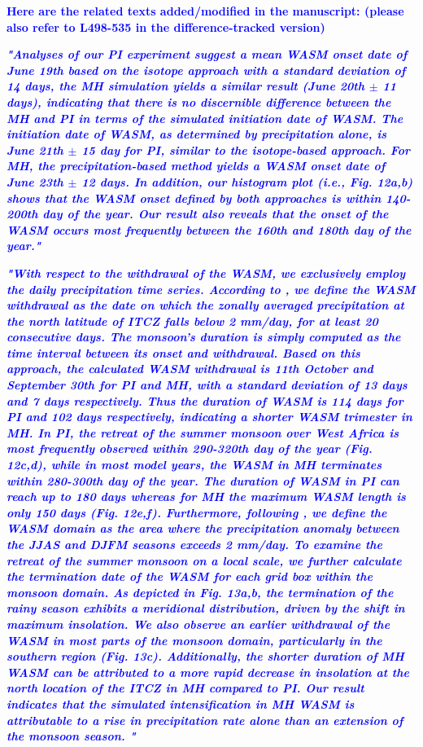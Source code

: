 \documentclass[gmd, manuscript]{copernicus}
\begin{document}
 \textcolor{blue}{\textbf{Here are the related texts added/modified in the manuscript: (please also refer to L498-535 in the difference-tracked version)}}

 \textcolor{blue}{\textbf{\textit{"Analyses of our PI experiment suggest a mean WASM onset date of June 19th  based on the isotope approach with a standard deviation of 14 days,  the MH simulation yields a similar result (June 20th $\pm$ 11 days),  indicating that there is no discernible difference between the MH and PI in terms of the simulated  initiation date  of WASM. The initiation date of WASM, as determined by precipitation alone, is June 21th $\pm$ 15 day for PI, similar to the isotope-based approach. For MH,  the precipitation-based method yields a  WASM onset date of June 23th $\pm$ 12 days.  In addition, our histogram plot (i.e., Fig. 12a,b) shows that the WASM onset defined by both approaches is  within 140-200th day of the year. Our result also reveals that the onset of the WASM occurs most frequently between the 160th and 180th day of the year."}}}

 \textcolor{blue}{\textbf{\textit{"With respect to the withdrawal of the WASM, we exclusively employ the daily precipitation time series.   According to \citet{pausata2016impacts}, we define the WASM withdrawal as the date on which the zonally averaged precipitation at the north latitude of ITCZ falls below 2 mm/day, for at least 20 consecutive days. The monsoon’s duration is simply computed as the time interval between its onset and withdrawal. Based on this approach, the calculated WASM withdrawal is  11th October and September 30th for  PI and MH, with a standard deviation of 13 days and 7 days respectively. Thus the duration of WASM is 114 days for PI and 102 days respectively, indicating a shorter WASM trimester in MH. In PI, the retreat of the summer monsoon over West Africa is most frequently observed within 290-320th day of the year (Fig. 12c,d), while in most model years, the WASM in MH terminates within 280-300th day of the year. The duration of WASM in PI can reach up to 180 days whereas for MH the maximum WASM length is only 150 days (Fig. 12e,f). Furthermore, following  \citet{d2019northern}, we define the WASM domain as the area where the precipitation anomaly between the JJAS and DJFM seasons exceeds 2 mm/day. To examine the retreat of the summer monsoon on a local scale,  we further  calculate the termination date of the WASM for each grid box within the monsoon domain. As depicted in Fig. 13a,b, the termination of the rainy season exhibits a meridional distribution, driven by the shift in maximum insolation. We also observe an earlier withdrawal of the WASM in most parts of the monsoon domain, particularly in the southern region (Fig. 13c). Additionally, the shorter duration of MH WASM can be attributed to a more rapid decrease in insolation at the north location of the ITCZ in MH compared to PI. Our result indicates that the simulated intensification in MH WASM is attributable to  a rise in precipitation rate alone than an extension of the monsoon season. "}}}
 
\end{document}
